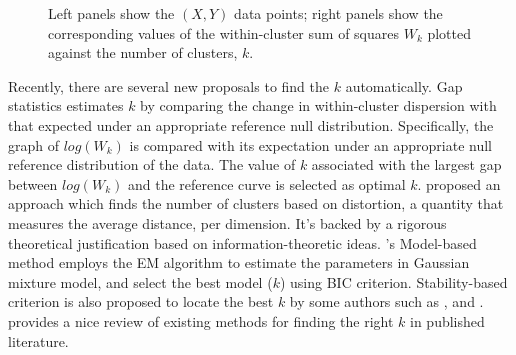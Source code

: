 \documentclass[11pt]{article}
\begin{document}
\begin{figure}
\begin{minipage}{\linewidth}
\begin{minipage}{0.45\linewidth}
  \end{minipage}
\end{minipage}
\caption{Left panels show the $(X,Y)$ data points; right panels
  show the corresponding values of the within-cluster sum of squares $W_k$
plotted against the number of clusters, $k$.}
\label{fig:elbow}
\end{figure}


Recently, there are several new proposals to find the $k$ automatically. Gap statistics \citep{tibshirani2001estimating} estimates $k$ by comparing the change in within-cluster dispersion with that expected under an appropriate reference null distribution. Specifically, the graph of $log(W_k)$ is compared with its expectation under an appropriate null reference distribution of the data. The value of $k$ associated with the largest gap between $log(W_k)$ and the reference curve is selected as optimal $k$. \cite{sugar2003finding} proposed an approach which finds the number of clusters based on distortion, a quantity that measures the average distance, per dimension. It's backed by a rigorous theoretical justification based on information-theoretic ideas.   \cite{fraley2002model}'s Model-based method employs the EM algorithm to estimate the parameters in Gaussian mixture model, and select the best model ($k$) using BIC criterion. Stability-based criterion is also proposed to locate the best $k$ by some authors such as \cite{ben2001stability}, \cite{wang2010consistent} and \cite{fang2012selection}. \cite{chiang2010intelligent} provides a nice review of existing methods for finding the right $k$ in published literature. \\
\end{document}
